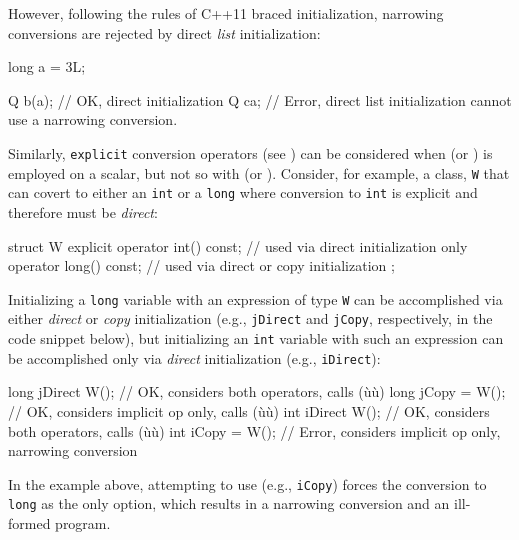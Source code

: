 However, following the rules of C++11 braced initialization, narrowing
conversions are rejected by direct \emph{list} initialization:

\begin{emcppslisting}
long a = 3L;

Q b(a);  // OK, direct initialization
Q c{a};  // Error, direct list initialization cannot use a narrowing conversion.
\end{emcppslisting}


\noindent Similarly, \lstinline!explicit! conversion operators (see
) can be considered when
 (or ) is employed on a scalar, but not so with
 (or ). Consider, for example, a class, \lstinline!W! that can
covert to either an \lstinline!int! or a \lstinline!long! where conversion to
\lstinline!int! is explicit and therefore must be \emph{direct}:

\begin{emcppslisting}
struct W
{
    explicit operator int()  const;  // used via direct initialization only
             operator long() const;  // used via direct or copy initialization
};
\end{emcppslisting}


\noindent Initializing a \lstinline!long! variable with an expression of type
\lstinline!W! can be accomplished via either \emph{direct} or \emph{copy}
initialization (e.g., \lstinline!jDirect! and \lstinline!jCopy!, respectively,
in the code snippet below), but initializing an \lstinline!int! variable
with such an expression can be accomplished only via \emph{direct}
initialization (e.g., \lstinline!iDirect!):

\begin{emcppslisting}
long jDirect {W()};  // OK, considers both operators, calls (ù{}ù)
long jCopy = {W()};  // OK, considers implicit op only, calls (ù{}ù)
int  iDirect {W()};  // OK, considers both operators, calls (ù{}ù)
int  iCopy = {W()};  // Error, considers implicit op only, narrowing conversion
\end{emcppslisting}


\noindent In the example above, attempting to use  (e.g., \lstinline!iCopy!) forces the conversion to
\lstinline!long! as the only option, which results in a narrowing
conversion and an ill-formed program.

